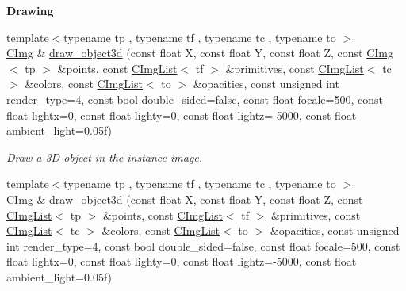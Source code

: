 \begin{Indent}{\bf Drawing}
\begin{DoxyCompactItemize}
\item 
{\footnotesize template$<$typename tp , typename tf , typename tc , typename to $>$ }\\\hyperlink{structcimg__library_1_1_c_img}{C\-Img} \& \hyperlink{structcimg__library_1_1_c_img_ae1fe96df1ca8aaf7165b2e66fe798839}{draw\-\_\-object3d} (const float X, const float Y, const float Z, const \hyperlink{structcimg__library_1_1_c_img}{C\-Img}$<$ tp $>$ \&points, const \hyperlink{structcimg__library_1_1_c_img_list}{C\-Img\-List}$<$ tf $>$ \&primitives, const \hyperlink{structcimg__library_1_1_c_img_list}{C\-Img\-List}$<$ tc $>$ \&colors, const \hyperlink{structcimg__library_1_1_c_img_list}{C\-Img\-List}$<$ to $>$ \&opacities, const unsigned int render\-\_\-type=4, const bool double\-\_\-sided=false, const float focale=500, const float lightx=0, const float lighty=0, const float lightz=-\/5000, const float ambient\-\_\-light=0.\-05f)
\begin{DoxyCompactList}\small\item\em Draw a 3\-D object in the instance image. \end{DoxyCompactList}\item 
\hypertarget{structcimg__library_1_1_c_img_a453c4ba21c7985ba19f8936865e4f9f4}{{\footnotesize template$<$typename tp , typename tf , typename tc , typename to $>$ }\\\hyperlink{structcimg__library_1_1_c_img}{C\-Img} \& \hyperlink{structcimg__library_1_1_c_img_a453c4ba21c7985ba19f8936865e4f9f4}{draw\-\_\-object3d} (const float X, const float Y, const float Z, const \hyperlink{structcimg__library_1_1_c_img_list}{C\-Img\-List}$<$ tp $>$ \&points, const \hyperlink{structcimg__library_1_1_c_img_list}{C\-Img\-List}$<$ tf $>$ \&primitives, const \hyperlink{structcimg__library_1_1_c_img_list}{C\-Img\-List}$<$ tc $>$ \&colors, const \hyperlink{structcimg__library_1_1_c_img_list}{C\-Img\-List}$<$ to $>$ \&opacities, const unsigned int render\-\_\-type=4, const bool double\-\_\-sided=false, const float focale=500, const float lightx=0, const float lighty=0, const float lightz=-\/5000, const float ambient\-\_\-light=0.\-05f)}\label{structcimg__library_1_1_c_img_a453c4ba21c7985ba19f8936865e4f9f4}


\end{DoxyCompactItemize}
\end{Indent}
